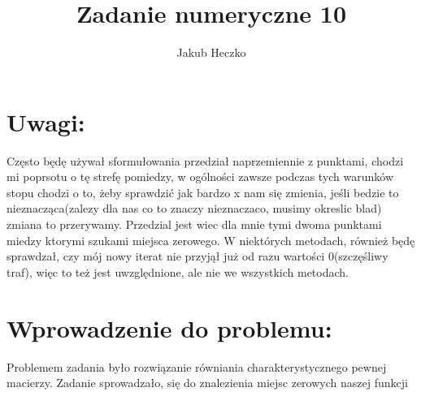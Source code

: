 \documentclass[12pt]{article}
\begin{document}
\title{{\Large}Zadanie numeryczne 10}
\date{}
\author{Jakub Heczko}

\maketitle
\section{Uwagi:}
Często będę używał sformułowania przedział naprzemiennie z punktami, chodzi mi poprsotu o tę strefę pomiedzy, w ogólności zawsze podczas tych warunków stopu chodzi o to, żeby sprawdzić jak bardzo x nam się zmienia, jeśli bedzie to nieznacząca(zalezy dla nas co to znaczy nieznaczaco, musimy okreslic blad) zmiana to przerywamy. Przedzial jest wiec dla mnie tymi dwoma punktami miedzy ktorymi szukami miejsca zerowego. W niektórych metodach, również będę sprawdzał, czy mój nowy iterat nie przyjął już od razu wartości 0(szczęśliwy traf), więc to też jest uwzględnione, ale nie we wszystkich metodach.

\section{Wprowadzenie do problemu: }
Problemem zadania było rozwiązanie równiania charakterystycznego pewnej macierzy. Zadanie sprowadzało, się do znalezienia miejsc zerowych naszej funkcji
\end{document}
